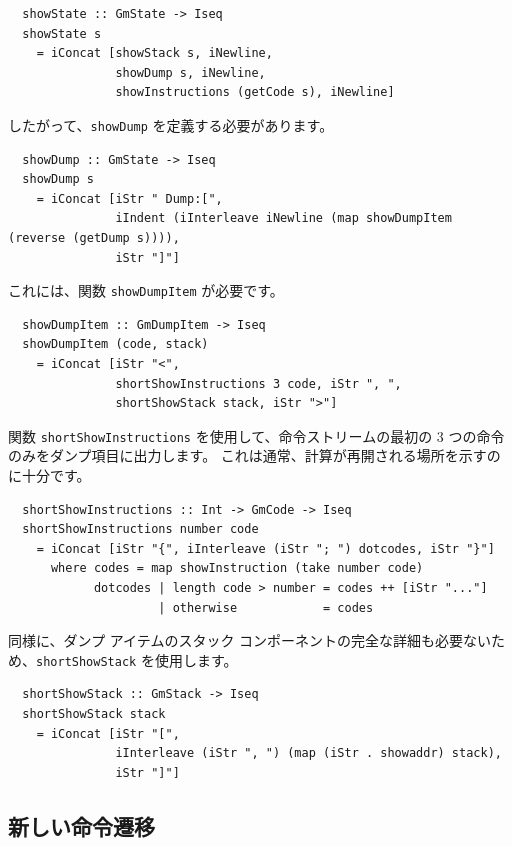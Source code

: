 \documentclass{jbook}
\begin{document}
\begin{verbatim}
  showState :: GmState -> Iseq
  showState s
    = iConcat [showStack s, iNewline,
               showDump s, iNewline,
               showInstructions (getCode s), iNewline]
\end{verbatim}

したがって、\texttt{showDump} を定義する必要があります。

\begin{verbatim}
  showDump :: GmState -> Iseq
  showDump s
    = iConcat [iStr " Dump:[",
               iIndent (iInterleave iNewline (map showDumpItem (reverse (getDump s)))),
               iStr "]"]
\end{verbatim}

これには、関数 \texttt{showDumpItem} が必要です。

\begin{verbatim}
  showDumpItem :: GmDumpItem -> Iseq
  showDumpItem (code, stack)
    = iConcat [iStr "<",
               shortShowInstructions 3 code, iStr ", ",
               shortShowStack stack, iStr ">"]
\end{verbatim}

関数 \texttt{shortShowInstructions} を使用して、命令ストリームの最初の 3 つの命令のみをダンプ項目に出力します。
これは通常、計算が再開される場所を示すのに十分です。

\begin{verbatim}
  shortShowInstructions :: Int -> GmCode -> Iseq
  shortShowInstructions number code
    = iConcat [iStr "{", iInterleave (iStr "; ") dotcodes, iStr "}"]
      where codes = map showInstruction (take number code)
            dotcodes | length code > number = codes ++ [iStr "..."]
                     | otherwise            = codes
\end{verbatim}

同様に、ダンプ アイテムのスタック コンポーネントの完全な詳細も必要ないため、\texttt{shortShowStack} を使用します。

\begin{verbatim}
  shortShowStack :: GmStack -> Iseq
  shortShowStack stack
    = iConcat [iStr "[",
               iInterleave (iStr ", ") (map (iStr . showaddr) stack),
               iStr "]"]
\end{verbatim}

\subsection{新しい命令遷移} \label{sec_3_6_3}
\end{document}
